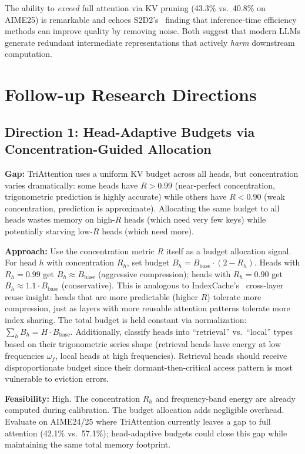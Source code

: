 \documentclass[11pt]{article}
\begin{document}
The ability to \textit{exceed} full attention via KV pruning (43.3\% vs.\ 40.8\% on AIME25) is remarkable and echoes S2D2's~\cite{s2d2} finding that inference-time efficiency methods can improve quality by removing noise. Both suggest that modern LLMs generate redundant intermediate representations that actively \textit{harm} downstream computation.

\section{Follow-up Research Directions}

\subsection{Direction 1: Head-Adaptive Budgets via Concentration-Guided Allocation}

\textbf{Gap:} TriAttention uses a uniform KV budget across all heads, but concentration varies dramatically: some heads have $R > 0.99$ (near-perfect concentration, trigonometric prediction is highly accurate) while others have $R < 0.90$ (weak concentration, prediction is approximate). Allocating the same budget to all heads wastes memory on high-$R$ heads (which need very few keys) while potentially starving low-$R$ heads (which need more).

\textbf{Approach:} Use the concentration metric $R$ itself as a budget allocation signal. For head $h$ with concentration $R_h$, set budget $B_h = B_{\mathrm{base}} \cdot (2 - R_h)$. Heads with $R_h = 0.99$ get $B_h \approx B_{\mathrm{base}}$ (aggressive compression); heads with $R_h = 0.90$ get $B_h \approx 1.1 \cdot B_{\mathrm{base}}$ (conservative). This is analogous to IndexCache's~\cite{indexcache} cross-layer reuse insight: heads that are more predictable (higher $R$) tolerate more compression, just as layers with more reusable attention patterns tolerate more index sharing. The total budget is held constant via normalization: $\sum_h B_h = H \cdot B_{\mathrm{base}}$. Additionally, classify heads into ``retrieval'' vs.\ ``local'' types based on their trigonometric series shape (retrieval heads have energy at low frequencies $\omega_f$, local heads at high frequencies). Retrieval heads should receive disproportionate budget since their dormant-then-critical access pattern is most vulnerable to eviction errors.

\textbf{Feasibility:} High. The concentration $R_h$ and frequency-band energy are already computed during calibration. The budget allocation adds negligible overhead. Evaluate on AIME24/25 where TriAttention currently leaves a gap to full attention (42.1\% vs.\ 57.1\%); head-adaptive budgets could close this gap while maintaining the same total memory footprint.
\end{document}
